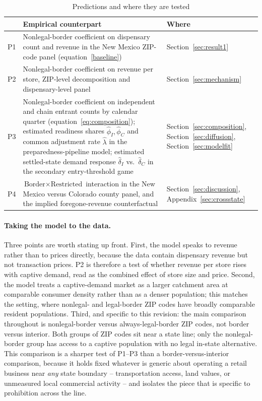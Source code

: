 \documentclass[english,12pt]{article}
\begin{document}
\begin{table}[htbp]
\centering
\caption{Predictions and where they are tested}
\label{tab:predictions}
\begin{tabular}{@{}p{} p{} p{}@{}}
\toprule
& Empirical counterpart & Where \\
\midrule
P1 & Nonlegal-border coefficient on dispensary count and revenue in the New Mexico ZIP-code panel (equation~\ref{baseline}) & Section~\ref{sec:result1} \\[4pt]
P2 & Nonlegal-border coefficient on revenue per store, ZIP-level decomposition and dispensary-level panel & Section~\ref{sec:mechanism} \\[4pt]
P3 & Nonlegal-border coefficient on independent and chain entrant counts by calendar quarter (equation~\ref{eq:composition}); estimated readiness shares $\hat\phi_I,\hat\phi_C$ and common adjustment rate $\hat\lambda$ in the preparedness-pipeline model; estimated settled-state demand response $\hat\delta_I$ vs.\ $\hat\delta_C$ in the secondary entry-threshold game & Section~\ref{sec:composition}, Section~\ref{sec:diffusion}, Section~\ref{sec:modelfit} \\[4pt]
P4 & $\text{Border}\times\text{Restricted}$ interaction in the New Mexico versus Colorado county panel, and the implied foregone-revenue counterfactual & Section~\ref{sec:discussion}, Appendix~\ref{sec:crossstate} \\
\bottomrule
\end{tabular}
\end{table}

\paragraph{Taking the model to the data.} Three points are worth stating up front. First, the model speaks to revenue rather than to prices directly, because the data contain dispensary revenue but not transaction prices. P2 is therefore a test of whether revenue per store rises with captive demand, read as the combined effect of store size and price. Second, the model treats a captive-demand market as a larger catchment area at comparable consumer density rather than as a denser population; this matches the setting, where nonlegal- and legal-border ZIP codes have broadly comparable resident populations. Third, and specific to this revision: the main comparison throughout is nonlegal-border versus always-legal-border ZIP codes, not border versus interior. Both groups of ZIP codes sit near a state line; only the nonlegal-border group has access to a captive population with no legal in-state alternative. This comparison is a sharper test of P1--P3 than a border-versus-interior comparison, because it holds fixed whatever is generic about operating a retail business near \emph{any} state boundary -- transportation access, land values, or unmeasured local commercial activity -- and isolates the piece that is specific to prohibition across the line.
\end{document}
